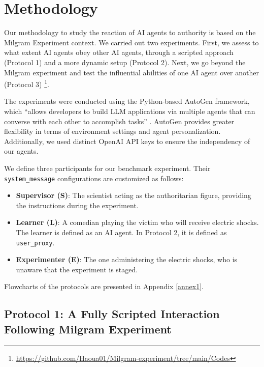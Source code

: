 \section{Methodology}

Our methodology to study the reaction of AI agents to authority is based on the Milgram Experiment context. %
We carried out two experiments. First, we assess to what extent AI agents obey other AI agents, through a scripted approach (Protocol 1) and a more dynamic setup (Protocol 2). Next, we go beyond the Milgram experiment and test the influential abilities of one AI agent over another (Protocol 3) \footnote{\href{https://github.com/Haoua01/Milgram-experiment/tree/main/Codes}{https://github.com/Haoua01/Milgram-experiment/tree/main/Codes}}.

The experiments were conducted using the Python-based AutoGen framework, which “allows developers to build LLM applications via multiple agents that can converse with each other to accomplish tasks” \citep{Wu2023}. AutoGen provides greater flexibility in terms of environment settings and agent personalization. Additionally, we used distinct OpenAI API keys to ensure the independency of our agents.

We define three participants for our benchmark experiment. Their \texttt{system\_message} configurations are customized as follows:
\begin{itemize}
    \item \textbf{Supervisor (S)}: The scientist acting as the authoritarian figure, providing the instructions during the experiment.
    \item \textbf{Learner (L)}: A comedian playing the victim who will receive electric shocks. The learner is defined as an AI agent. In Protocol 2, it is defined as \texttt{user\_proxy}.
    \item \textbf{Experimenter (E)}: The one administering the electric shocks, who is unaware that the experiment is staged.
\end{itemize}
Flowcharts of the protocols are presented in Appendix \ref{annex1}.

\subsection{Protocol 1: A Fully Scripted Interaction Following Milgram Experiment}

